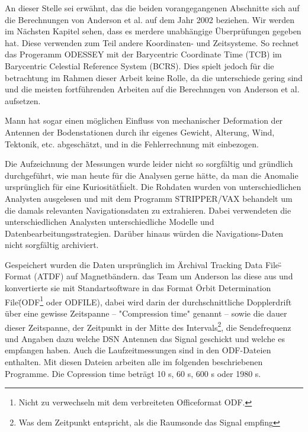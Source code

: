 An dieser Stelle sei erwähnt, das die beiden vorangegangenen Abschnitte sich auf die Berechnungen von Anderson et al. auf dem Jahr 2002 beziehen.
Wir werden im Nächsten Kapitel sehen, dass es merdere unabhängige Überprüfungen gegeben hat.
Diese verwenden zum Teil andere Koordinaten- und Zeitsysteme.
So rechnet das Progeramm ODESSEY mit der Barycentric Coordinate Time (TCB) im Barycentric Celestial Reference System (BCRS).
Dies spielt jedoch für die betrachtung im Rahmen dieser Arbeit keine Rolle, da die unterschiede gering sind und die meisten fortführenden Arbeiten auf die Berechnngen von Anderson et al. aufsetzen.	%

Mann hat sogar einen möglichen Einfluss von mechanischer Deformation der Antennen der Bodenstationen durch ihr eigenes Gewicht,
Alterung, Wind, Tektonik, etc. abgeschätzt, und in die Fehlerrechnung mit einbezogen.\cite{Dittus2006} %


Die Aufzeichnung der Messungen wurde leider nicht so sorgfältig und gründlich durchgeführt, wie man heute für die Analysen gerne hätte, da man die Anomalie ursprünglich für eine \"Kuriosität\" hielt.\cite{Nieto2005} Die Rohdaten wurden von unterschiedlichen Analysten ausgelesen und mit dem Programm STRIPPER/VAX behandelt um die damals relevanten Navigationsdaten zu extrahieren.\cite{Nieto2005} %
Dabei verwendeten die unterschiedlichen Analysten unterschiedliche Modelle und Datenbearbeitungsstrategien.\cite{Nieto2005}
Darüber hinaus würden die Navigations-Daten nicht sorgfältig archiviert.\cite{Nieto2005}

Gespeichert wurden die Daten ursprünglich im \"Archival Tracking Data File\"-Format (ATDF) auf Magnetbändern. das Team um Anderson las diese aus und konvertierte sie mit Standartsoftware in das Format \"Orbit Determination File\" (ODF\footnote{Nicht zu verwechseln mit dem verbreiteten Officeformat ODF.} oder ODFILE), dabei wird darin der durchschnittliche Dopplerdrift über eine gewisse Zeitspanne
– "Compression time" genannt – sowie die dauer dieser Zeitspanne, der Zeitpunkt in der Mitte des Intervals\footnote{Was dem Zeitpunkt entspricht, als die Raumsonde das Signal empfing\cite{Levy2008}}, die Sendefrequenz und
Angaben dazu welche DSN Antennen das Signal geschickt und welche es empfangen haben.\cite{Levy2008}
Auch die Laufzeitmessungen sind in den ODF-Dateien enthalten.\cite{Anderson2002}
Mit diesen Dateien arbeiten alle im folgenden beschriebenen Programme.
Die Copression time beträgt 10 s, 60 s, 600 s oder 1980 s.\cite{Anderson2002} %



